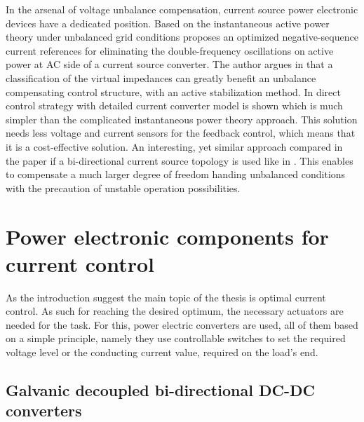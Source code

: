 In the arsenal of voltage unbalance compensation, current source power electronic devices have a dedicated position. Based on the instantaneous active power theory under unbalanced  grid conditions \cite{wang2016dc} proposes an optimized negative-sequence current  references  for  eliminating  the double-frequency  oscillations  on  active  power  at  AC  side of a current source converter. The author argues in \cite{wang2014virtual} that a classification of the virtual impedances can greatly benefit an unbalance compensating control structure, with an active stabilization method. In \cite{guo2018advanced} direct control strategy with detailed current converter model is shown which is much simpler than the complicated instantaneous power theory approach. This solution needs less voltage and current sensors for the feedback control, which means that it is a cost-effective solution. An interesting, yet similar approach compared in the paper if a bi-directional current source topology is used like in \cite{vekhande2015control}. This enables to compensate a much larger degree of freedom handing unbalanced conditions with the precaution of unstable operation possibilities.\\

\section{Power electronic components for current control}\label{BASICCSR:sec:PowerGeneral}

As the introduction suggest the main topic of the thesis is optimal current control. As such for reaching the desired optimum, the necessary actuators are needed for the task. For this, power electric converters are used, all of them based on a simple principle, namely they use controllable switches to set the required voltage level or the conducting current value, required on the load's end.


\subsection{Galvanic decoupled bi-directional DC-DC converters}\label{BASICCSR:sec:DCDC}

